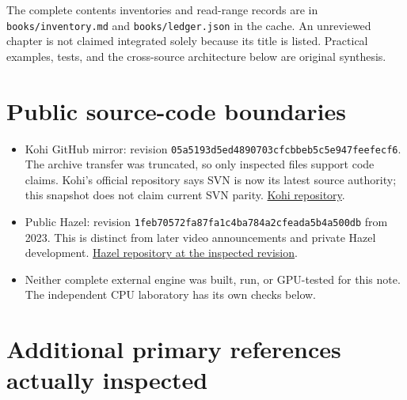 The complete contents inventories and read-range records are in \texttt{books/inventory.md} and \texttt{books/ledger.json} in the cache. An unreviewed chapter is not claimed integrated solely because its title is listed. Practical examples, tests, and the cross-source architecture below are original synthesis.

\section{Public source-code boundaries}\label{appendix-877738f6f4d2-public-source-code-boundaries}

\begin{itemize}
\tightlist
\item
  Kohi GitHub mirror: revision \texttt{05a5193d5ed4890703cfcbbeb5c5e947feefecf6}. The archive transfer was truncated, so only inspected files support code claims. Kohi's official repository says SVN is now its latest source authority; this snapshot does not claim current SVN parity. \href{https://github.com/travisvroman/kohi}{Kohi repository}.
\item
  Public Hazel: revision \texttt{1feb70572fa87fa1c4ba784a2cfeada5b4a500db} from 2023. This is distinct from later video announcements and private Hazel development. \href{https://github.com/TheCherno/Hazel/tree/1feb70572fa87fa1c4ba784a2cfeada5b4a500db}{Hazel repository at the inspected revision}.
\item
  Neither complete external engine was built, run, or GPU-tested for this note. The independent CPU laboratory has its own checks below.
\end{itemize}

\section{Additional primary references actually inspected}\label{appendix-877738f6f4d2-additional-primary-references-actually-inspected}


